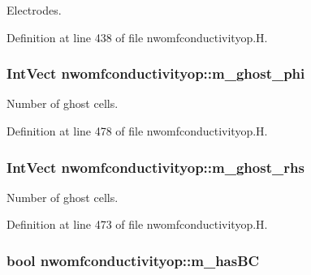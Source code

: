 Electrodes. 



Definition at line 438 of file nwomfconductivityop.\+H.

\subsubsection[{\texorpdfstring{m\+\_\+ghost\+\_\+phi}{m_ghost_phi}}]{\setlength{\rightskip}{0pt plus 5cm}Int\+Vect nwomfconductivityop\+::m\+\_\+ghost\+\_\+phi\hspace{0.3cm}{\ttfamily [protected]}}\hypertarget{classnwomfconductivityop_a46d6b000f62dc6a02da0a4c191534946}{}\label{classnwomfconductivityop_a46d6b000f62dc6a02da0a4c191534946}


Number of ghost cells. 



Definition at line 478 of file nwomfconductivityop.\+H.

\subsubsection[{\texorpdfstring{m\+\_\+ghost\+\_\+rhs}{m_ghost_rhs}}]{\setlength{\rightskip}{0pt plus 5cm}Int\+Vect nwomfconductivityop\+::m\+\_\+ghost\+\_\+rhs\hspace{0.3cm}{\ttfamily [protected]}}\hypertarget{classnwomfconductivityop_a398ed6241b4306f2aba557b1853f112f}{}\label{classnwomfconductivityop_a398ed6241b4306f2aba557b1853f112f}


Number of ghost cells. 



Definition at line 473 of file nwomfconductivityop.\+H.

\subsubsection[{\texorpdfstring{m\+\_\+has\+BC}{m_hasBC}}]{\setlength{\rightskip}{0pt plus 5cm}bool nwomfconductivityop\+::m\+\_\+has\+BC\hspace{0.3cm}{\ttfamily [protected]}}\hypertarget{classnwomfconductivityop_a7720528788de57c5737c585e400fc31a}{}\label{classnwomfconductivityop_a7720528788de57c5737c585e400fc31a}


